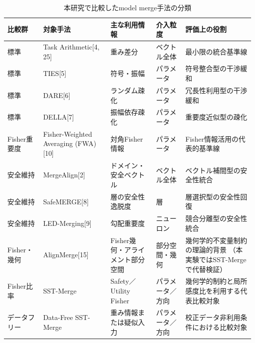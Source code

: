 \documentclass{article}
\begin{document}
\begin{table}[t]
\centering
\caption{本研究で比較したmodel merge手法の分類}
\label{tab:baseline_methods}
\small
\begin{tabular}{p{1.8cm}p{2.6cm}p{2.8cm}p{2.3cm}p{4.3cm}}
\toprule
比較群 & 対象手法 & 主な利用情報 & 介入粒度 & 評価上の役割 \\
\midrule

標準 & Task Arithmetic[4, 25] & 重み差分 & ベクトル全体 & 最小限の統合基準線 \\

標準 & TIES[5] & 符号・振幅 & パラメータ & 符号整合型の干渉緩和 \\

標準 & DARE[6] & ランダム疎化 & パラメータ & 冗長性利用型の干渉緩和 \\

標準 & DELLA[7] & 振幅依存疎化 & パラメータ & 重要度近似型の疎化 \\

Fisher重要度 & Fisher-Weighted Averaging (FWA)[10] & 対角Fisher情報 & パラメータ & Fisher情報活用の代表的基準線 \\

安全維持 & MergeAlign[2] & ドメイン・安全ベクトル & ベクトル全体 & ベクトル補間型の安全性統合 \\

安全維持 & SafeMERGE[8] & 層の安全性逸脱度 & 層 & 層選択型の安全性回復 \\

安全維持 & LED-Merging[9] & 勾配重要度 & ニューロン & 競合分離型の安全性統合 \\

Fisher・幾何 & AlignMerge[15] & Fisher幾何・アライメント部分空間 & 部分空間・幾何 & 幾何学的不変量制約の理論的背景
（本実験ではSST-Mergeで代替検証） \\

Fisher比率 & SST-Merge & Safety／Utility Fisher & パラメータ／方向 & 幾何学的制約と局所感度比を利用する代表比較対象 \\

データフリー & Data-Free SST-Merge & 重み情報または疑似入力 & パラメータ／方向 & 校正データ非利用条件における比較対象 \\
\bottomrule
\end{tabular}
\end{table}

\end{document}
